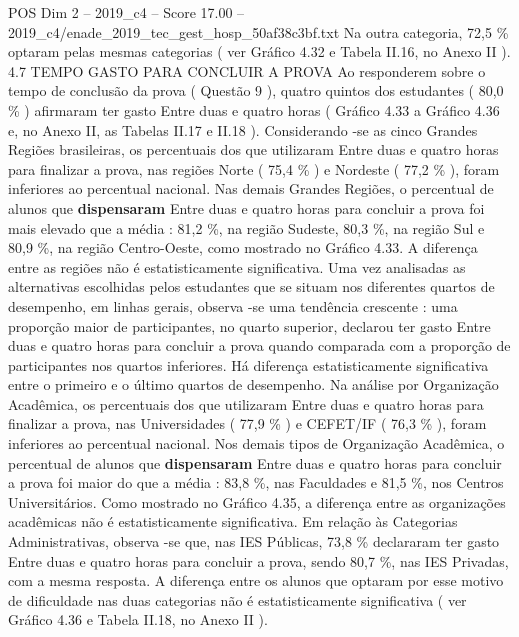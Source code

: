 \begin{textsample}{POS Dim 2 – 2019\_c4 – Score 17.00 – 2019\_c4/enade\_2019\_tec\_gest\_hosp\_50af38c3bf.txt}
Na outra categoria, 72,5 \% optaram pelas mesmas categorias ( ver Gráfico 4.32 e Tabela II.16, no Anexo II ). 4.7 TEMPO GASTO PARA CONCLUIR A PROVA Ao responderem sobre o tempo de conclusão da prova ( Questão 9 ), quatro quintos dos estudantes ( 80,0 \% ) afirmaram ter gasto Entre duas e quatro horas ( Gráfico 4.33 a Gráfico 4.36 e, no Anexo II, as Tabelas II.17 e II.18 ).
Considerando -se as cinco Grandes Regiões brasileiras, os percentuais dos que utilizaram Entre duas e quatro horas para finalizar a prova, nas regiões Norte ( 75,4 \% ) e Nordeste ( 77,2 \% ), foram inferiores ao percentual nacional.
Nas demais Grandes Regiões, o percentual de alunos que \textbf{dispensaram} Entre duas e quatro horas para concluir a prova foi mais elevado que a média : 81,2 \%, na região Sudeste, 80,3 \%, na região Sul e 80,9 \%, na região Centro-Oeste, como mostrado no Gráfico 4.33.
A diferença entre as regiões não é estatisticamente significativa.
Uma vez analisadas as alternativas escolhidas pelos estudantes que se situam nos diferentes quartos de desempenho, em linhas gerais, observa -se uma tendência crescente : uma proporção maior de participantes, no quarto superior, declarou ter gasto Entre duas e quatro horas para concluir a prova quando comparada com a proporção de participantes nos quartos inferiores.
Há diferença estatisticamente significativa entre o primeiro e o último quartos de desempenho.
Na análise por Organização Acadêmica, os percentuais dos que utilizaram Entre duas e quatro horas para finalizar a prova, nas Universidades ( 77,9 \% ) e CEFET/IF ( 76,3 \% ), foram inferiores ao percentual nacional.
Nos demais tipos de Organização Acadêmica, o percentual de alunos que \textbf{dispensaram} Entre duas e quatro horas para concluir a prova foi maior do que a média : 83,8 \%, nas Faculdades e 81,5 \%, nos Centros Universitários.
Como mostrado no Gráfico 4.35, a diferença entre as organizações acadêmicas não é estatisticamente significativa.
Em relação às Categorias Administrativas, observa -se que, nas IES Públicas, 73,8 \% declararam ter gasto Entre duas e quatro horas para concluir a prova, sendo 80,7 \%, nas IES Privadas, com a mesma resposta.
A diferença entre os alunos que optaram por esse motivo de dificuldade nas duas categorias não é estatisticamente significativa ( ver Gráfico 4.36 e Tabela II.18, no Anexo II ).

\end{textsample}
